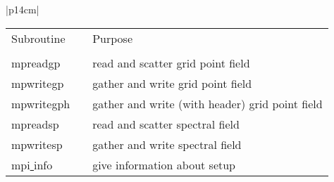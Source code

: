 \begin{center}
\begin{tabular}{|p{14cm}|}
\begin{center}
\begin{tabular}{l p{2cm} l}
Subroutine & &Purpose \\
&& \\
{\sub mpreadgp}& & read and scatter grid point field \\
{\sub mpwritegp}& & gather and write grid point field \\
{\sub mpwritegph} && gather and write (with header) grid point field \\
{\sub mpreadsp} & &read and scatter spectral field \\
{\sub mpwritesp} &&gather and write spectral field \\
{\sub mpi\underline{ }info} && give information about setup \\
\end{tabular}
\end{center}

\vspace{3mm} \\

\hline
\end{tabular}
\end{center}
\newpage

